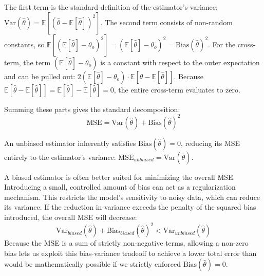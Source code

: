 \documentclass[11pt, a4paper]{article}
\begin{document}
The first term is the standard definition of the estimator's variance: $\text{Var}(\hat{\theta}) = \mathbb{E}\left[(\hat{\theta} - \mathbb{E}[\hat{\theta}])^2\right]$. 
The second term consists of non-random constants, so $\mathbb{E}\left[(\mathbb{E}[\hat{\theta}] - \theta_o)^2\right] = (\mathbb{E}[\hat{\theta}] - \theta_o)^2 = \text{Bias}(\hat{\theta})^2$. 
For the cross-term, the term $(\mathbb{E}[\hat{\theta}] - \theta_o)$ is a constant with respect to the outer expectation and can be pulled out: $2(\mathbb{E}[\hat{\theta}] - \theta_o) \cdot \mathbb{E}[\hat{\theta} - \mathbb{E}[\hat{\theta}]]$. Because $\mathbb{E}[\hat{\theta} - \mathbb{E}[\hat{\theta}]] = \mathbb{E}[\hat{\theta}] - \mathbb{E}[\hat{\theta}] = 0$, the entire cross-term evaluates to zero.

Summing these parts gives the standard decomposition:
\begin{equation}
    \text{MSE} = \text{Var}(\hat{\theta}) + \text{Bias}(\hat{\theta})^2
\end{equation}

An unbiased estimator inherently satisfies $\text{Bias}(\hat{\theta}) = 0$, reducing its MSE entirely to the estimator's variance: $\text{MSE}_{unbiased} = \text{Var}(\hat{\theta})$. 

A biased estimator is often better suited for minimizing the overall MSE. Introducing a small, controlled amount of bias can act as a regularization mechanism. This restricts the model's sensitivity to noisy data, which can reduce its variance. If the reduction in variance exceeds the penalty of the squared bias introduced, the overall MSE will decrease:
\begin{equation}
    \text{Var}_{biased}(\hat{\theta}) + \text{Bias}_{biased}(\hat{\theta})^2 < \text{Var}_{unbiased}(\hat{\theta})
\end{equation}
Because the MSE is a sum of strictly non-negative terms, allowing a non-zero bias lets us exploit this bias-variance tradeoff to achieve a lower total error than would be mathematically possible if we strictly enforced $\text{Bias}(\hat{\theta}) = 0$.
\end{document}
